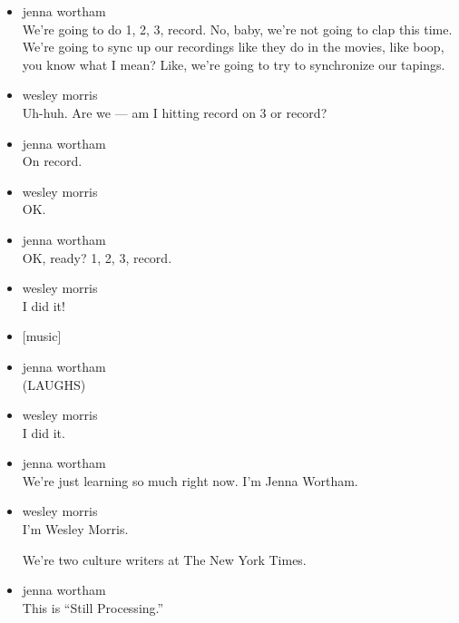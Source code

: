 \begin{itemize}
\item
  jenna wortham\\
  We're going to do 1, 2, 3, record. No, baby, we're not going to clap
  this time. We're going to sync up our recordings like they do in the
  movies, like boop, you know what I mean? Like, we're going to try to
  synchronize our tapings.
\item
  wesley morris\\
  Uh-huh. Are we --- am I hitting record on 3 or record?
\item
  jenna wortham\\
  On record.
\item
  wesley morris\\
  OK.
\item
  jenna wortham\\
  OK, ready? 1, 2, 3, record.
\item
  wesley morris\\
  I did it!
\item
  {[}music{]}
\item
  jenna wortham\\
  (LAUGHS)
\item
  wesley morris\\
  I did it.
\item
  jenna wortham\\
  We're just learning so much right now. I'm Jenna Wortham.
\item
  wesley morris\\
  I'm Wesley Morris.

  We're two culture writers at The New York Times.
\item
  jenna wortham\\
  This is ``Still Processing.''


\end{itemize}
